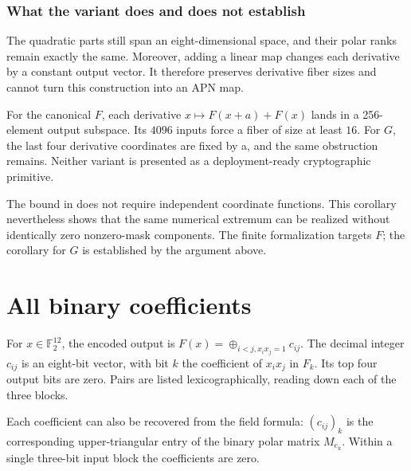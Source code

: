 \documentclass[11pt,a4paper]{article}
\newcommand{\F}{\mathbb F}
\theoremstyle{definition}
\begin{document}
\subsubsection*{What the variant does and does not establish}

The quadratic parts still span an eight-dimensional space, and their polar ranks remain exactly the same. Moreover, adding a linear map changes each derivative by a constant output vector. It therefore preserves derivative fiber sizes and cannot turn this construction into an APN map.


For the canonical $F$, each derivative $x\mapsto F(x+a)+F(x)$ lands in a 256-element output subspace. Its $4096$ inputs force a fiber of size at least $16$. For $G$, the last four derivative coordinates are fixed by a, and the same obstruction remains. Neither variant is presented as a deployment-ready cryptographic primitive.


The bound in \cite{ref1} does not require independent coordinate functions. This corollary nevertheless shows that the same numerical extremum can be realized without identically zero nonzero-mask components. The finite formalization targets $F$; the corollary for $G$ is established by the argument above.


\clearpage\appendix

\section{All binary coefficients}\label{app:A}

For $x\in \F_{2}^{12}$, the encoded output is $F(x)=\oplus _{i<j,x_{i}x_{j}=1} c_{ij}$. The decimal integer $c_{ij}$ is an eight-bit vector, with bit $k$ the coefficient of $x_{i}x_{j}$ in $F_{k}$. Its top four output bits are zero. Pairs are listed lexicographically, reading down each of the three blocks.


Each coefficient can also be recovered from the field formula: $(c_{ij})_{k}$ is the corresponding upper-triangular entry of the binary polar matrix $M_{e_{k}}$. Within a single three-bit input block the coefficients are zero.
\end{document}
